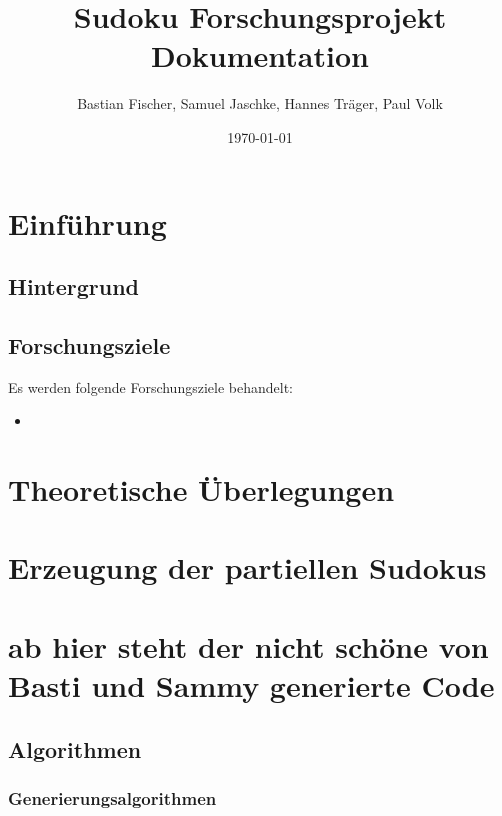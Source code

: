 \documentclass[12pt,a4paper]{article}
\title{Sudoku Forschungsprojekt Dokumentation}
\author{Bastian Fischer, Samuel Jaschke, Hannes Träger, Paul Volk}
\date{\today}
\begin{document}
\maketitle

\begin{abstract}
\end{abstract}

\section{Einführung}
\subsection{Hintergrund}

\subsection{Forschungsziele}
Es werden folgende Forschungsziele behandelt:
\begin{itemize}
    \item  
\end{itemize}

\section{Theoretische Überlegungen}



\section{Erzeugung der partiellen Sudokus}





\section{ab hier steht der nicht schöne von Basti und Sammy generierte Code}
\subsection{Algorithmen}
\subsubsection{Generierungsalgorithmen}

\end{document}
